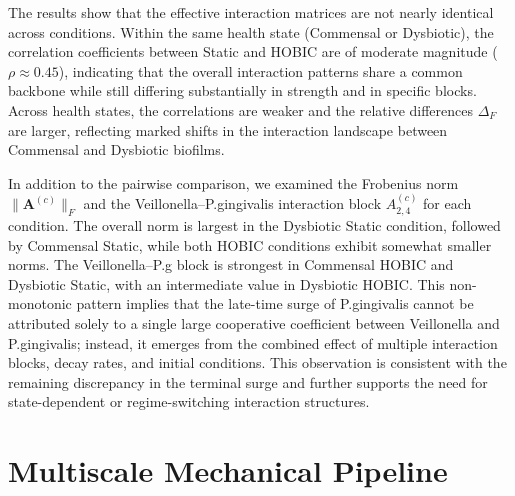 \documentclass[11pt,a4paper]{article}
\begin{document}
The results show that the effective interaction matrices are not nearly identical across conditions. Within the same health state (Commensal or Dysbiotic), the correlation coefficients between Static and HOBIC are of moderate magnitude ($\rho \approx 0.45$), indicating that the overall interaction patterns share a common backbone while still differing substantially in strength and in specific blocks. Across health states, the correlations are weaker and the relative differences $\Delta_F$ are larger, reflecting marked shifts in the interaction landscape between Commensal and Dysbiotic biofilms.

In addition to the pairwise comparison, we examined the Frobenius norm $\lVert \mathbf{A}^{(c)} \rVert_F$ and the Veillonella--P.gingivalis interaction block $A^{(c)}_{2,4}$ for each condition. The overall norm is largest in the Dysbiotic Static condition, followed by Commensal Static, while both HOBIC conditions exhibit somewhat smaller norms. The Veillonella--P.g block is strongest in Commensal HOBIC and Dysbiotic Static, with an intermediate value in Dysbiotic HOBIC. This non-monotonic pattern implies that the late-time surge of P.gingivalis cannot be attributed solely to a single large cooperative coefficient between Veillonella and P.gingivalis; instead, it emerges from the combined effect of multiple interaction blocks, decay rates, and initial conditions. This observation is consistent with the remaining discrepancy in the terminal surge and further supports the need for state-dependent or regime-switching interaction structures.

\section{Multiscale Mechanical Pipeline}
\label{sec:fem_pipeline}
\end{document}
